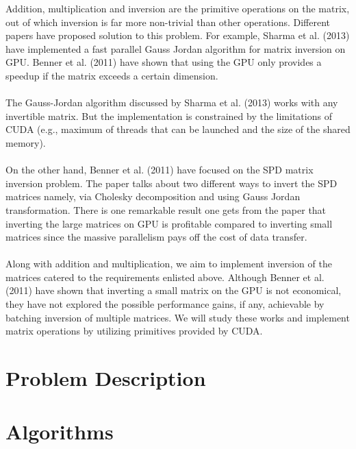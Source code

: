 \documentclass[11pt]{article}
\begin{document}
Addition, multiplication and inversion are the primitive operations on the matrix, out of which inversion is far more non-trivial than other operations. Different papers have proposed solution to this problem. For example, Sharma et al. (2013) have implemented a fast parallel Gauss Jordan algorithm for matrix inversion on GPU. Benner et al. (2011) have shown that using the GPU only provides a speedup if the matrix exceeds a certain dimension. \\\\
The Gauss-Jordan algorithm discussed by Sharma et al. (2013) works with any invertible matrix. But the implementation is constrained by the limitations of CUDA (e.g., maximum of threads that can be launched and the size of the shared memory).\\\\
On the other hand, Benner et al. (2011) have focused on the SPD matrix inversion problem. The paper talks about two different ways to invert the SPD matrices namely, via Cholesky decomposition and using Gauss Jordan transformation. There is one remarkable result one gets from the paper that inverting the large matrices on GPU is profitable compared to inverting small matrices since the massive parallelism pays off the cost of data transfer.\\\\
Along with addition and multiplication, we aim to implement inversion of the matrices catered to the requirements enlisted above. Although Benner et al. (2011) have shown that inverting a small matrix on the GPU is not economical, they have not explored the possible performance gains, if any, achievable by batching inversion of multiple matrices. We will study these works and implement matrix operations by utilizing primitives provided by CUDA.


\section{Problem Description}


\section{Algorithms}
\end{document}
